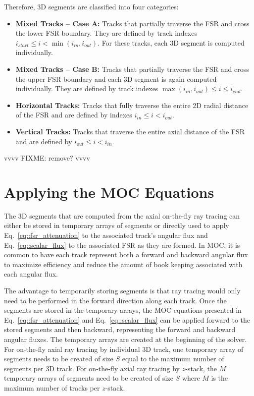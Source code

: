 Therefore, 3D segments are classified into four categories:

\begin{itemize}
	\item \textbf{Mixed Tracks -- Case A:} Tracks that partially traverse the FSR and cross the lower FSR boundary. They are defined by track indexes $i_{\textit{start}} \leq i < \min\left(i_{\textit{in}}, i_{\textit{out}}\right)$. For these tracks, each 3D segment is computed individually. 
	\item \textbf{Mixed Tracks -- Case B:} Tracks that partially traverse the FSR and cross the upper FSR boundary and each 3D segment is again computed individually. They are defined by track indexes $\max\left(i_{\textit{in}}, i_{\textit{out}}\right)  \leq i  \leq i_{\textit{end}}$.
	\item \textbf{Horizontal Tracks:} Tracks that fully traverse the entire 2D radial distance of the FSR and are defined by indexes $i_{\textit{in}} \leq i < i_{\textit{out}}$. 
	\item \textbf{Vertical Tracks:} Tracks that traverse the entire axial distance of the FSR and are defined by $i_{\textit{out}} \leq i < i_{\textit{in}}$.
\end{itemize}

vvvv FIXME: remove? vvvv

\section{Applying the MOC Equations}
The 3D segments that are computed from the axial on-the-fly ray tracing can either be stored in temporary arrays of segments or directly used to apply Eq.~\ref{eq::fsr_attenuation} to the associated track's angular flux and Eq.~\ref{eq::scalar_flux} to the associated FSR as they are formed. In MOC, it is common to have each track represent both a forward and backward angular flux to maximize efficiency and reduce the amount of book keeping associated with each angular flux. 

The advantage to temporarily storing segments is that ray tracing would only need to be performed in the forward direction along each track. Once the segments are stored in the temporary arrays, the MOC equations presented in Eq.~\ref{eq::fsr_attenuation} and Eq.~\ref{eq::scalar_flux} can be applied forward to the stored segments and then backward, representing the forward and backward angular fluxes. The temporary arrays are created at the beginning of the solver. For on-the-fly axial ray tracing by individual 3D track, one temporary array of segments needs to be created of size $S$ equal to the maximum number of segments per 3D track. For on-the-fly axial ray tracing by $z$-stack, the $M$ temporary arrays of segments need to be created of size $S$ where $M$ is the maximum number of tracks per $z$-stack.

